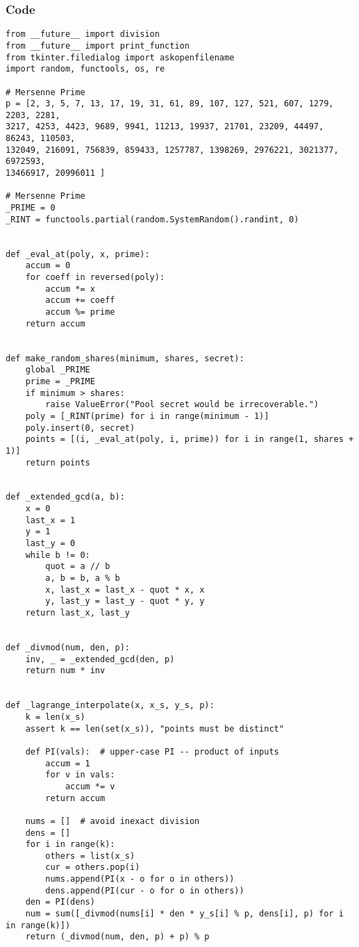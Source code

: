 \documentclass[fleqn,12pt,a4paper]{article}
\begin{document}
\subsubsection{Code}
\vspace{5mm}
\begin{verbatim}
from __future__ import division
from __future__ import print_function
from tkinter.filedialog import askopenfilename
import random, functools, os, re

# Mersenne Prime
p = [2, 3, 5, 7, 13, 17, 19, 31, 61, 89, 107, 127, 521, 607, 1279, 2203, 2281, 
3217, 4253, 4423, 9689, 9941, 11213, 19937, 21701, 23209, 44497, 86243, 110503, 
132049, 216091, 756839, 859433, 1257787, 1398269, 2976221, 3021377, 6972593, 
13466917, 20996011 ]

# Mersenne Prime
_PRIME = 0
_RINT = functools.partial(random.SystemRandom().randint, 0)


def _eval_at(poly, x, prime):
    accum = 0
    for coeff in reversed(poly):
        accum *= x
        accum += coeff
        accum %= prime
    return accum


def make_random_shares(minimum, shares, secret):
    global _PRIME
    prime = _PRIME
    if minimum > shares:
        raise ValueError("Pool secret would be irrecoverable.")
    poly = [_RINT(prime) for i in range(minimum - 1)]
    poly.insert(0, secret)
    points = [(i, _eval_at(poly, i, prime)) for i in range(1, shares + 1)]
    return points


def _extended_gcd(a, b):
    x = 0
    last_x = 1
    y = 1
    last_y = 0
    while b != 0:
        quot = a // b
        a, b = b, a % b
        x, last_x = last_x - quot * x, x
        y, last_y = last_y - quot * y, y
    return last_x, last_y


def _divmod(num, den, p):
    inv, _ = _extended_gcd(den, p)
    return num * inv


def _lagrange_interpolate(x, x_s, y_s, p):
    k = len(x_s)
    assert k == len(set(x_s)), "points must be distinct"

    def PI(vals):  # upper-case PI -- product of inputs
        accum = 1
        for v in vals:
            accum *= v
        return accum

    nums = []  # avoid inexact division
    dens = []
    for i in range(k):
        others = list(x_s)
        cur = others.pop(i)
        nums.append(PI(x - o for o in others))
        dens.append(PI(cur - o for o in others))
    den = PI(dens)
    num = sum([_divmod(nums[i] * den * y_s[i] % p, dens[i], p) for i in range(k)])
    return (_divmod(num, den, p) + p) % p



\end{verbatim}
\end{document}
